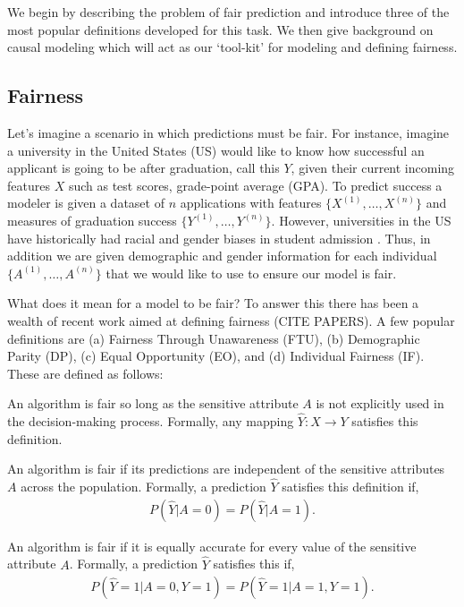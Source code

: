 We begin by describing the problem of fair prediction and introduce three of the most popular definitions developed for this task.  We then give background on causal modeling which will act as our `tool-kit' for modeling and defining fairness.

\subsection{Fairness}
Let's imagine a scenario in which predictions must be fair. For instance, imagine a university in the United States (US) would like to know how successful an applicant is going to be after graduation, call this $Y$, given their current incoming features $X$ such as test scores, grade-point average (GPA). To predict success a modeler is given a dataset of $n$ applications with features $\{X^{(1)}, \ldots, X^{(n)} \}$ and measures of graduation success $\{Y^{(1)}, \ldots, Y^{(n)}\}$. However, universities in the US have historically had racial and gender biases in student admission \cite{kane1998racial,kidder2000portia}. Thus, in addition we are given demographic and gender information for each individual $\{A^{(1)}, \ldots, A^{(n)}\}$ that we would like to use to ensure our model is fair.

What does it mean for a model to be fair? To answer this there has been a wealth of recent work aimed at defining fairness (CITE PAPERS). A few popular definitions are (a) Fairness Through Unawareness (FTU), (b) Demographic Parity (DP), (c) Equal Opportunity (EO), and (d) Individual Fairness (IF). These are defined as follows:

\begin{define}
An algorithm is fair so long as the sensitive attribute $A$ is not explicitly used in the decision-making process. Formally, any mapping $\hat{Y}: X \rightarrow Y$ satisfies this definition.
\end{define}

\begin{define}
An algorithm is fair if its predictions are independent of the sensitive attributes $A$ across the population. Formally, a prediction $\hat{Y}$ satisfies this definition if, 
\begin{align}
P(\hat{Y} | A = 0) = P(\hat{Y} | A = 1). \nonumber
\end{align}
\end{define}

\begin{define}
An algorithm is fair if it is equally accurate for every value of the sensitive attribute $A$. Formally, a prediction $\hat{Y}$ satisfies this if,
\begin{align}
P(\hat{Y}=1 | A=0,Y=1) = P(\hat{Y}=1 | A=1,Y=1). \nonumber
\end{align}
\end{define}

